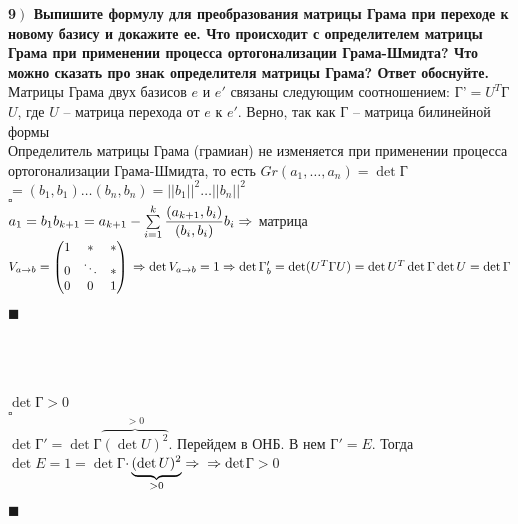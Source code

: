 \documentclass[a4paper,12pt]{article}
\begin{document}
    \textbf{9$\left.\right)$ Выпишите формулу для преобразования матрицы Грама при переходе к новому базису и докажите ее. Что происходит с определителем матрицы Грама при применении процесса ортогонализации Грама-Шмидта? Что можно сказать про знак определителя матрицы Грама? Ответ обоснуйте.}\\
    Матрицы Грама двух базисов $e$ и $e'$ связаны следующим соотношением: Г'$=U^T$Г$U$, где $U$ -- матрица перехода от $e$ к $e'$. Верно, так как Г -- матрица билинейной формы\\
    Определитель матрицы Грама (грамиан) не изменяется при применении процесса ортогонализации Грама-Шмидта, то есть $Gr(a_1, \ldots, a_n)=\det$Г$=(b_1, b_1)\ldots(b_n, b_n)=||b_1||^2\ldots||b_n||^2$\\
    $\square$\\
    $a_1=b_1\\
    b_{k+1}=a_{k+1}-\sum\limits_{i=1}^k\dfrac{(a_{k+1}, b_i)}{(b_i, b_i)}b_i\\
    \Rightarrow$ матрица $V_{a\rightarrow b}=\begin{pmatrix}
                                                 1 & \ast   & \ast \\
                                                 0 & \ddots & \ast \\
                                                 0 & 0      & 1
    \end{pmatrix}\\\Rightarrow\det V_{a\rightarrow b}=1\Rightarrow\det\Gamma_b'=\det(U^T\Gamma U)=\det U^T\det\Gamma\det U=\det\Gamma$
    \begin{flushright}
        $\blacksquare$
    \end{flushright}
    \textbf{}\\\\\\
    $\det$Г$>0$\\
    $\square$\\
    $\det$Г$'=\det$Г$\overbrace{(\det U)^2}^{>0}$. Перейдем в ОНБ. В нем Г$'=E$. Тогда $\det E=1=\det$Г$\cdot\underbrace{(\det U)^2}_{>0}\Rightarrow\\\Rightarrow\det$Г$>0$
    \begin{flushright}
        $\blacksquare$
    \end{flushright}
\end{document}
